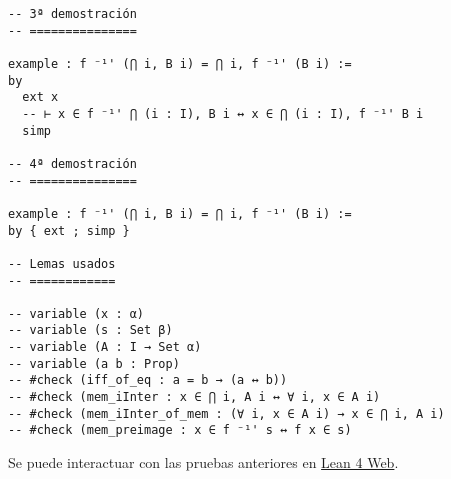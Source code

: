 \begin{verbatim}
-- 3ª demostración
-- ===============

example : f ⁻¹' (⋂ i, B i) = ⋂ i, f ⁻¹' (B i) :=
by
  ext x
  -- ⊢ x ∈ f ⁻¹' ⋂ (i : I), B i ↔ x ∈ ⋂ (i : I), f ⁻¹' B i
  simp

-- 4ª demostración
-- ===============

example : f ⁻¹' (⋂ i, B i) = ⋂ i, f ⁻¹' (B i) :=
by { ext ; simp }

-- Lemas usados
-- ============

-- variable (x : α)
-- variable (s : Set β)
-- variable (A : I → Set α)
-- variable (a b : Prop)
-- #check (iff_of_eq : a = b → (a ↔ b))
-- #check (mem_iInter : x ∈ ⋂ i, A i ↔ ∀ i, x ∈ A i)
-- #check (mem_iInter_of_mem : (∀ i, x ∈ A i) → x ∈ ⋂ i, A i)
-- #check (mem_preimage : x ∈ f ⁻¹' s ↔ f x ∈ s)
\end{verbatim}
Se puede interactuar con las pruebas anteriores en \href{https://lean.math.hhu.de/\#url=https://raw.githubusercontent.com/jaalonso/Calculemus2/main/src/Imagen\_inversa\_de\_la\_interseccion\_general.lean}{Lean 4 Web}.

